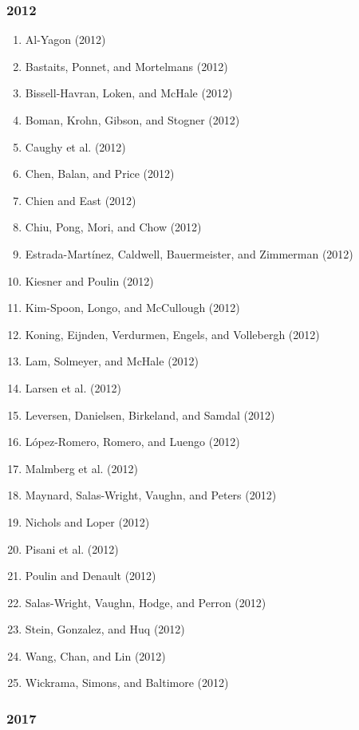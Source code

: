 \documentclass[english,man]{apa6}
\providecommand{\tightlist}{%
  \setlength{\itemsep}{0pt}\setlength{\parskip}{0pt}}
\theoremstyle{definition}
\theoremstyle{definition}
\theoremstyle{definition}
\theoremstyle{remark}
\begin{document}
\subsubsection{2012}\label{section-14}

\begin{enumerate}
\def\labelenumi{\arabic{enumi})}
\tightlist
\item
  Al-Yagon (2012)
\item
  Bastaits, Ponnet, and Mortelmans (2012)
\item
  Bissell-Havran, Loken, and McHale (2012)
\item
  Boman, Krohn, Gibson, and Stogner (2012)
\item
  Caughy et al. (2012)
\item
  Chen, Balan, and Price (2012)
\item
  Chien and East (2012)
\item
  Chiu, Pong, Mori, and Chow (2012)
\item
  Estrada-Martínez, Caldwell, Bauermeister, and Zimmerman (2012)
\item
  Kiesner and Poulin (2012)
\item
  Kim-Spoon, Longo, and McCullough (2012)
\item
  Koning, Eijnden, Verdurmen, Engels, and Vollebergh (2012)
\item
  Lam, Solmeyer, and McHale (2012)
\item
  Larsen et al. (2012)
\item
  Leversen, Danielsen, Birkeland, and Samdal (2012)
\item
  López-Romero, Romero, and Luengo (2012)
\item
  Malmberg et al. (2012)
\item
  Maynard, Salas-Wright, Vaughn, and Peters (2012)
\item
  Nichols and Loper (2012)
\item
  Pisani et al. (2012)
\item
  Poulin and Denault (2012)
\item
  Salas-Wright, Vaughn, Hodge, and Perron (2012)
\item
  Stein, Gonzalez, and Huq (2012)
\item
  Wang, Chan, and Lin (2012)
\item
  Wickrama, Simons, and Baltimore (2012)
\end{enumerate}

\subsubsection{2017}\label{section-15}
\end{document}
